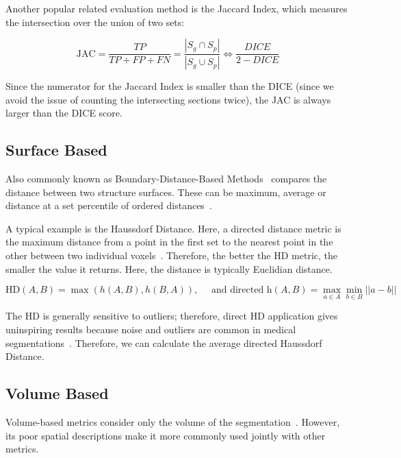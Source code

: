 \documentclass[12pt,twoside]{report}
\begin{document}
Another popular related evaluation method is the Jaccard Index, which measures the intersection over the union of two sets:

\begin{equation*}
 \text{JAC} = \frac{TP}{TP+FP+FN} = \frac{|S_g\cap S_p|}{|S_g \cup S_p|} \iff \frac{DICE}{2 - DICE}
\end{equation*}

Since the numerator for the Jaccard Index is smaller than the DICE (since we avoid the issue of counting the intersecting sections twice), the JAC is always larger than the DICE score.

\subsection{Surface Based}\label{sect:surface-based}

Also commonly known as Boundary-Distance-Based Methods~\cite{boundary-overlap-metrics} compares the distance between two structure
surfaces. These can be maximum, average or distance at a set percentile of ordered distances~\cite{evaluation-metrics}.

A typical example is the Haussdorf Distance. Here, a directed distance metric is the maximum distance from a point in the first set to the nearest point in the other between two individual voxels~\cite{boundary-overlap-metrics}. Therefore, the better the HD metric, the smaller the value it returns. Here, the distance is typically Euclidian distance.

\begin{equation*}
 \text{HD}(A,B) = \max(h(A,B), h(B,A)), \quad \text{ and directed h}(A,B)=\max_{a\in A}\min_{b \in B} ||a-b||
\end{equation*}

The HD is generally sensitive to outliers; therefore, direct HD application gives uninspiring results because noise and outliers are common in medical segmentations~\cite{boundary-overlap-metrics}. Therefore, we can calculate the average directed Haussdorf Distance.

\subsection{Volume Based}

Volume-based metrics consider only the volume of the segmentation~\cite{evaluation-of-metrics-in-prostate,review-metrics, boundary-overlap-metrics}. However, its poor spatial descriptions make it more commonly used jointly with other metrics.
\end{document}
